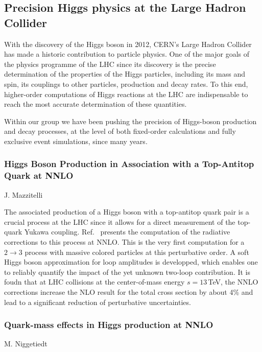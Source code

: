 \documentclass{FBR_Bericht_2025}
\begin{document}
\subsection{Precision Higgs physics at the Large Hadron Collider}
\begin{refsection}
With the discovery of the Higgs boson in 2012, CERN's Large Hadron Collider has made a 
historic contribution to particle physics. One of the major goals of the physics programme
of the LHC since its discovery is the precise determination of the properties of the Higgs
particles, including its mass and spin, its couplings to other particles, production and decay
rates. To this end, higher-order computations of Higgs reactions at the LHC are indispensable
to reach the most accurate determination of these quantities.

Within our group we have been pushing the precision of Higgs-boson production and decay
processes, at the level of both fixed-order calculations and fully exclusive event simulations,
since many years. 


\subsubsection{Higgs Boson Production in Association with a Top-Antitop Quark at NNLO}
\begin{Namen}
 J. Mazzitelli 
\end{Namen}

The associated production of a Higgs boson with a top-antitop quark pair is a crucial process at the LHC since it allows for a direct measurement of the top-quark Yukawa coupling. Ref.~\cite{Catani:2022mfv} presents the computation of the radiative corrections to this process at NNLO. This is the very first computation for a $2 \to 3$  process with massive colored particles at this perturbative order. A soft Higgs boson approximation for loop amplitudes is developped, which enables one to reliably quantify the impact of the yet unknown two-loop contribution. It is foudn that at LHC collisions at the center-of-mass energy $s=13$\,TeV, the NNLO corrections increase the NLO result for the total cross section by about 4\% and lead to a significant reduction of perturbative uncertainties.





\subsubsection{Quark-mass effects in Higgs production at NNLO}
\begin{Namen}
M. Niggetiedt
\end{Namen}
%


\end{refsection}
\end{document}
